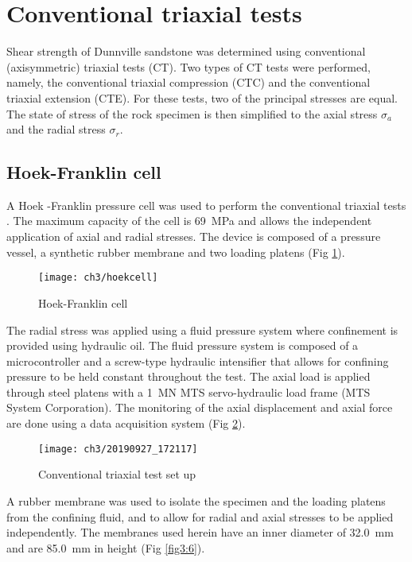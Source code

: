 \section{Conventional triaxial tests}\label{Conventional_Triaxial_tests}

Shear strength of Dunnville sandstone was determined using conventional (axisymmetric) triaxial tests (CT). Two types of CT tests were performed, namely, the conventional triaxial compression (CTC) and the conventional triaxial extension (CTE). For these tests, two of the principal stresses are equal. The state of stress of the rock specimen is then simplified to the axial stress $\sigma_a$ and the radial stress $\sigma_r$. 

\subsection{Hoek-Franklin cell}

A Hoek -Franklin pressure cell was used to perform the conventional triaxial tests \cite{Franklin1970}. The maximum capacity of the cell is \SI{69}{MPa} and allows the independent application of axial and radial stresses. The device is composed of a pressure vessel, a synthetic rubber membrane and two loading platens (Fig \ref{fig3:4}).

\begin{figure}[tb]
    \centering
    \texttt{[image: ch3/hoekcell]}
    \caption{Hoek-Franklin cell}
    \label{fig3:4}
\end{figure} 

The radial stress was applied using a fluid pressure system where confinement is provided using hydraulic oil. The fluid pressure system is composed of a microcontroller and a screw-type hydraulic intensifier that allows for confining pressure to be held constant throughout the test. The axial load is applied through steel platens with a \SI{1}{\mega\newton} MTS servo-hydraulic load frame (MTS System Corporation). The monitoring of the axial displacement and axial force are done using a data acquisition system (Fig \ref{fig3:5}).

\begin{figure}[tb]
    \centering
    \texttt{[image: ch3/20190927\_172117]}
    \caption{Conventional triaxial test set up}
    \label{fig3:5}
\end{figure} 

A rubber membrane was used to isolate the specimen and the loading platens from the confining fluid, and to allow for radial and axial stresses to be applied independently. The membranes used herein have an inner diameter of \SI{32.0}{mm} and are \SI{85.0}{mm} in height (Fig \ref{fig3:6}).

